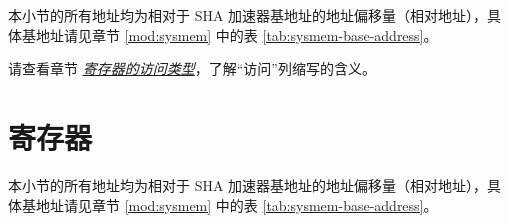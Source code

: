 \documentclass[main\_\_CN.tex]{subfiles}
\begin{document}
本小节的所有地址均为相对于 SHA 加速器基地址的地址偏移量（相对地址），具体基地址请见章节 \ref{mod:sysmem} \textit{} 中的表 \ref{tab:sysmem-base-address}。

请查看章节 \hyperref[glossary-access-types]{\textit{寄存器的访问类型}}，了解“访问”列缩写的含义。



\section{ 寄存器 }

本小节的所有地址均为相对于 SHA 加速器基地址的地址偏移量（相对地址），具体基地址请见章节 \ref{mod:sysmem} \textit{} 中的表 \ref{tab:sysmem-base-address}。


\end{document}
